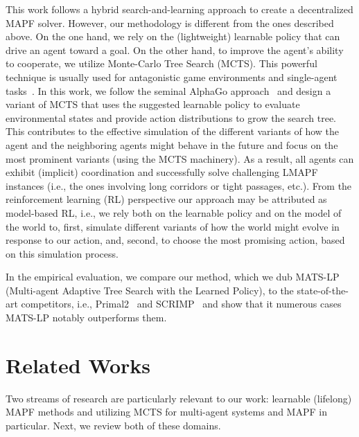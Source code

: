 \documentclass[letterpaper]{article} %
\begin{document}
This work follows a hybrid search-and-learning approach to create a decentralized MAPF solver. However, our methodology is different from the ones described above. On the one hand, we rely on the (lightweight) learnable policy that can drive an agent toward a goal. On the other hand, to improve the agent's ability to cooperate, we utilize Monte-Carlo Tree Search (MCTS). This powerful technique is usually used for antagonistic game environments and single-agent tasks~\cite{browne2012survey}. In this work, we follow the seminal AlphaGo approach~\cite{Silver2016,silver2017mastering} and design a variant of MCTS that uses the suggested learnable policy to evaluate environmental states and provide action distributions to grow the search tree. This contributes to the effective simulation of the different variants of how the agent and the neighboring agents might behave in the future and focus on the most prominent variants (using the MCTS machinery). As a result, all agents can exhibit (implicit) coordination and successfully solve challenging LMAPF instances (i.e., the ones involving long corridors or tight passages, etc.). From the reinforcement learning (RL) perspective our approach may be attributed as model-based RL, i.e., we rely both on the learnable policy and on the model of the world to, first, simulate different variants of how the world might evolve in response to our action, and, second, to choose the most promising action, based on this simulation process.

In the empirical evaluation, we compare our method, which we dub \textsc{MATS-LP} (Multi-agent Adaptive Tree Search with the Learned Policy), to the state-of-the-art competitors, i.e., Primal2~\cite{damani2021primal} and SCRIMP~\cite{wang_scrimp_2023} and show that it numerous cases \textsc{MATS-LP} notably outperforms them.




\section{Related Works}

Two streams of research are particularly relevant to our work: learnable (lifelong) MAPF methods and utilizing MCTS for multi-agent systems and MAPF in particular. Next, we review both of these domains.
\end{document}
